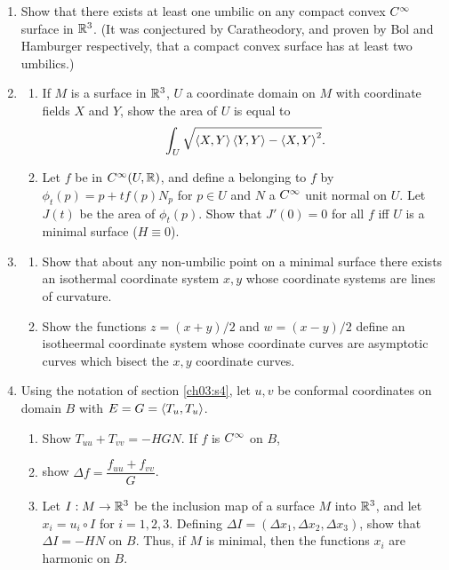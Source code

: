 \documentclass[../main]{subfiles}
\begin{document}
\begin{enumerate}
    \item\label{pro:86} Show that there exists at least one umbilic on any compact convex $C^\infty$ surface in $\mathbb{R}^3$. (It was conjectured by Caratheodory, and proven by Bol and Hamburger respectively, that a compact convex surface has at least two umbilics.)
    \item\label{pro:87} 
    \begin{enumerate}[label=(\roman*)]
        \item  If $M$ is a surface in $\mathbb{R}^3$, $U$ a coordinate domain on $M$ with coordinate fields $X$ and $Y$, show the area of $U$ is equal to \[\int_U\sqrt{\left\langle X,Y\right\rangle \left\langle Y,Y\right\rangle - \left\langle X,Y\right\rangle^2}.\]
        \item Let $f$ be in $C^\infty(U,\mathbb{R})$, and define a  belonging to $f$ by $\phi_t(p) = p+tf(p)N_p$ for $p\in U$ and $N$ a $C^\infty$ unit normal on $U$. Let $J(t)$ be the area of $\phi_t(p)$. Show that $J'(0) = 0$ for all $f$ iff $U$ is a minimal surface ($H\equiv 0$).
    \end{enumerate}
    
    \item\label{pro:88}
    \begin{enumerate}[label=(\roman*)]
        \item  Show that about any non-umbilic point on a minimal surface there exists an isothermal coordinate system $x,y$ whose coordinate systems are lines of curvature. 
        \item Show the functions $z=(x+y)/2$ and $w = (x-y)/2$ define an isotheermal coordinate system whose coordinate curves are asymptotic curves which bisect the $x,y$ coordinate curves.
    \end{enumerate}
    
    \item\label{pro:89} Using the notation of section \ref{ch03:s4}, let $u,v$ be conformal coordinates on domain $B$ with $E=G=\left\langle T_u,T_u\right\rangle$.
    \begin{enumerate}[label=(\roman*)]
        \item Show $T_{uu} + T_{vv} = -HGN$. If $f$ is $C^\infty$ on $B$,
        \item show $\Delta f = \dfrac{f_{uu} + f_{vv}}{G}$.
        \item Let $I:M\to \mathbb{R}^3$ be the inclusion map of a surface $M$ into $\mathbb{R}^3$, and let $x_i = u_i\circ I$ for $i=1,2,3$. Defining $\Delta I = (\Delta x_1, \Delta x_2, \Delta x_3)$, show that $\Delta I = -HN$ on $B$. Thus, if $M$ is minimal, then the functions $x_i$ are harmonic on $B$. 
    \end{enumerate}
      

\end{enumerate}
\end{document}
